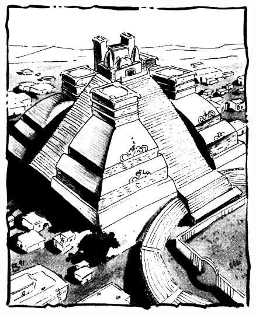 \begin{figure}[t!]
\centering
\includegraphics[width=\columnwidth]{images/draj-1.png}
\WOTC
\end{figure}


